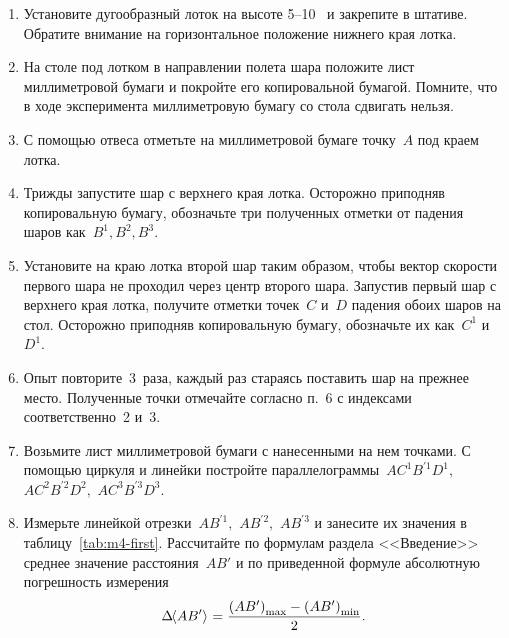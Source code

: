 \documentclass[a4paper, 12pt]{extarticle}
\begin{document}
\begin{enumerate}
  \item Установите дугообразный лоток на высоте 5--10~ и закрепите в штативе. Обратите внимание на горизонтальное положение нижнего края лотка.

  \item На столе под лотком в направлении полета шара положите лист миллиметровой бумаги и покройте его копировальной бумагой. Помните, что в ходе эксперимента миллиметровую бумагу со стола сдвигать нельзя.
  \item С помощью отвеса отметьте на миллиметровой бумаге точку~$A$ под краем лотка.
  \item Трижды запустите шар с верхнего края лотка. %
      Осторожно приподняв копировальную бумагу, обозначьте три полученных отметки от падения шаров как~$B^1, B^2, B^3.$
  \item Установите на краю лотка второй шар таким образом, чтобы вектор скорости первого шара не проходил через центр второго шара.
      Запустив первый шар с верхнего края лотка, получите отметки точек~$C$ и~$D$ падения обоих шаров на стол. Осторожно приподняв копировальную бумагу, обозначьте их как~$C^1$ и~$D^1$.

      \item
      Опыт повторите~3~раза, каждый раз стараясь поставить шар на прежнее место. Полученные точки отмечайте согласно п.~6 с индексами соответственно~2 и~3.
      \item Возьмите лист миллиметровой бумаги с нанесенными на нем точками. С помощью циркуля и линейки постройте параллелограммы~$A C^1 {B}^{'1} D^1,$ $A C^2 {B}^{'2} D^2,$ $A C^3 {B}^{'3} D^3.$ %
      \item Измерьте линейкой отрезки~$A{B}^{'1},$ $A{B}^{'2},$ $A{B}^{'3}$ и занесите их значения в таблицу~\ref{tab:m4-first}. Рассчитайте по формулам раздела <<Введение>> среднее значение %
расстояния~$AB'$ и по приведенной формуле абсолютную погрешность измерения
          \begin{equation} %
          \label{m4:value-deltaABs}
          \Delta \MTDMean{AB'}\ = \frac{\left(AB'\right)_{\max} - \left(AB'\right)_{\min}}{2}.
          \end{equation}


\end{enumerate}
\end{document}
